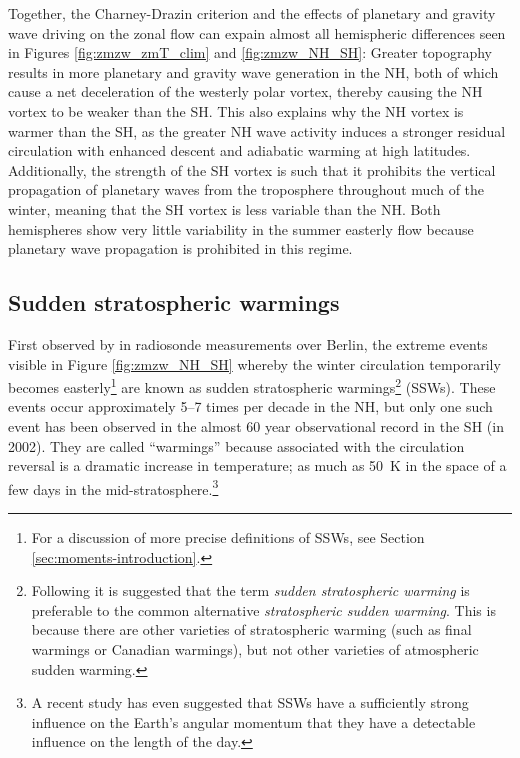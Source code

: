 \bigskip Together, the Charney-Drazin criterion and the effects of planetary and
gravity wave driving on the zonal flow can expain almost all hemispheric
differences seen in Figures \ref{fig:zmzw_zmT_clim} and \ref{fig:zmzw_NH_SH}:
Greater topography results in more planetary and gravity wave generation in the
NH, both of which cause a net deceleration of the westerly polar vortex, thereby
causing the NH vortex to be weaker than the SH. This also explains why the NH
vortex is warmer than the SH, as the greater NH wave activity induces a stronger
residual circulation with enhanced descent and adiabatic warming at high
latitudes. Additionally, the strength of the SH vortex is such that it prohibits
the vertical propagation of planetary waves from the troposphere throughout much
of the winter, meaning that the SH vortex is less variable than the NH. Both
hemispheres show very little variability in the summer easterly flow because
planetary wave propagation is prohibited in this regime.


\subsection{Sudden stratospheric warmings}
\label{sec:strat-sudd-warm}
First observed by \citet{Scherhag1952} in radiosonde measurements over Berlin,
the extreme events visible in Figure \ref{fig:zmzw_NH_SH} whereby the winter
circulation temporarily becomes easterly\footnote{For a discussion of more
  precise definitions of SSWs, see Section \ref{sec:moments-introduction}.} are
known as sudden stratospheric warmings\footnote{Following \citet{Butler2014a} it
  is suggested that the term \emph{sudden stratospheric warming} is preferable
  to the common alternative \emph{stratospheric sudden warming}. This is because
  there are other varieties of stratospheric warming (such as final warmings or
  Canadian warmings), but not other varieties of atmospheric sudden warming.}
(SSWs). These events occur approximately 5--7 times per decade in the NH, but
only one such event has been observed in the almost 60 year observational record
in the SH (in 2002). They are called ``warmings'' because associated with the
circulation reversal is a dramatic increase in temperature; as much as 50~K in
the space of a few days in the mid-stratosphere.\footnote{A recent study
  \citep{Neef2014} has even suggested that SSWs have a sufficiently strong
  influence on the Earth's angular momentum that they have a detectable
  influence on the length of the day.}

